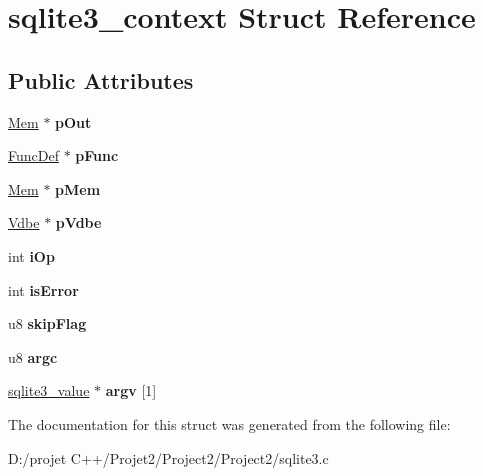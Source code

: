 \hypertarget{structsqlite3__context}{}\section{sqlite3\+\_\+context Struct Reference}
\label{structsqlite3__context}
\subsection*{Public Attributes}
\begin{DoxyCompactItemize}
\item 
\mbox{\label{structsqlite3__context_ae22b1db2ea357b70dda4a86b6df01f34}} 
\mbox{\hyperlink{structsqlite3__value}{Mem}} $\ast$ {\bfseries p\+Out}
\item 
\mbox{\label{structsqlite3__context_af4215c87be2c0cb10868f623a552a2aa}} 
\mbox{\hyperlink{struct_func_def}{Func\+Def}} $\ast$ {\bfseries p\+Func}
\item 
\mbox{\label{structsqlite3__context_a7b84aa5920329cb0eb943832175b48b5}} 
\mbox{\hyperlink{structsqlite3__value}{Mem}} $\ast$ {\bfseries p\+Mem}
\item 
\mbox{\label{structsqlite3__context_ab35b02abe9a81e0c8cbdaeb0aa1a5874}} 
\mbox{\hyperlink{struct_vdbe}{Vdbe}} $\ast$ {\bfseries p\+Vdbe}
\item 
\mbox{\label{structsqlite3__context_a6f5930106488b9ead6f8efefe9125b6c}} 
int {\bfseries i\+Op}
\item 
\mbox{\label{structsqlite3__context_ae4351b8da8c6d2676074612c1b8d4af5}} 
int {\bfseries is\+Error}
\item 
\mbox{\label{structsqlite3__context_a29c404b8744ed5967960c576f3e59bd3}} 
u8 {\bfseries skip\+Flag}
\item 
\mbox{\label{structsqlite3__context_a3246bd9287c845864193f0519804aede}} 
u8 {\bfseries argc}
\item 
\mbox{\label{structsqlite3__context_a416e22362626c80a9dd4c7909871d90c}} 
\mbox{\hyperlink{structsqlite3__value}{sqlite3\+\_\+value}} $\ast$ {\bfseries argv} \mbox{[}1\mbox{]}
\end{DoxyCompactItemize}


The documentation for this struct was generated from the following file\+:\begin{DoxyCompactItemize}
\item 
D\+:/projet C++/\+Projet2/\+Project2/\+Project2/sqlite3.\+c\end{DoxyCompactItemize}
